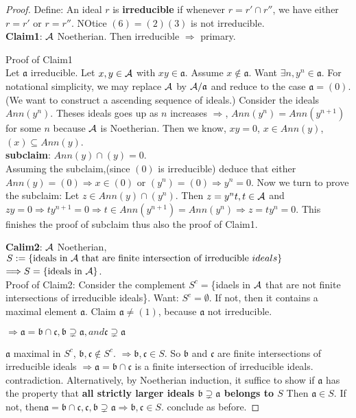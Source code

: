 \documentclass[11pt]{article}
\newcommand{\sca}{{\mathfrak a}}
\newcommand{\scb}{{\mathfrak b}}
\newcommand{\scc}{{\mathfrak c}}
\newcommand{\cala}{{\cal A}}
\newcommand{\Lrta}{\Longrightarrow}
\begin{document}
\begin{proof}
Define: An ideal $r$ is \textbf{irreducible} if whenever $r=r'\cap r''$, we have either $r=r'$ or $r=r''$. NOtice $(6)=(2)(3)$ is not irreducible.\\
\textbf{Claim1}: $\cala$ Noetherian. Then irreducible $\Lrta$ primary.

Proof of Claim1\\
Let $\sca$ irreducible. Let $x,y\in \cala$ with $xy \in \sca$. Assume $x\notin \sca$. Want $\exists n,y^n\in\sca$. For notational simplicity, we may replace $\cala$ by $\cala/\sca$ and reduce to the case $\sca=(0)$. (We want to construct a ascending sequence of ideals.) Consider the ideals $Ann(y^n)$. Theses ideals goes up  as $n$ increases $\Lrta$, $Ann(y^n)=Ann(y^{n+1})$ for some $n$ because $\cala$ is Noetherian. Then we know, $xy=0$, $x\in Ann(y)$, $(x)\subseteq Ann(y)$.\\
\textbf{subclaim}: $Ann(y)\cap(y)=0$.\\
 Assuming the subclaim,(since $(0)$ is irreducible) deduce that either $Ann(y)=(0)\Lrta x\in (0)$ or $(y^n)=(0)\Lrta y^n=0$.
 Now we turn to prove the subclaim: Let $z\in Ann(y)\cap(y^n)$. Then $z=y^n t, t\in \cala $ and $zy=0\Lrta t y^{n+1}=0\Lrta t\in Ann(y^{n+1})=Ann(y^n)\Lrta z= t y^n=0$. This finishes the proof of subclaim thus also the proof of Claim1.

 \textbf{Calim2}: $\cala$ Noetherian, $S:=\{\text{ideals in $\cala$ that are finite intersection of irreducible }ideals\}$ $\Lrta S=\{\text{ideals in $\cala$}\}$. \\
 Proof of Claim2: Consider the complement $S^c=$\{idaels in $\cala$ that are not finite intersections of irreducible ideals\}. Want: $S^c=\emptyset$. If not, then it contains a maximal element $\sca$. Claim $\sca\neq (1)$, because $\sca$ not irreducible. 

 $\Lrta\sca=\scb\cap \scc,\scb\supsetneq\sca, and \scc\supsetneq \sca$

 $\sca$ maximal in $S^c$, $\scb, \scc\notin S^c$. $\Lrta \scb,\scc\in S$. So $\scb$ and $\scc$ are finite intersections of irreducible ideals $\Lrta\sca=\scb\cap\scc$ is a finite intersection of irreducible ideals. contradiction.
Alternatively, by Noetherian induction, it suffice to show if $\sca$ has the property that \textbf{all strictly larger ideals $\scb\supsetneq \sca$ belongs to $S$} Then $\sca\in S$. If not, then$\sca=\scb\cap\scc, \scc,\scb\supsetneq \sca\Lrta \scb,\scc\in S$. conclude as before.
\end{proof}
\end{document}
